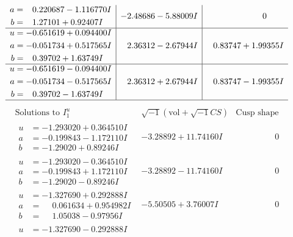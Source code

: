 \documentclass[1p]{elsarticle_modified}
\theoremstyle{definition}
\newcommand{\I}{\sqrt{-1}}
\begin{document}
$$\begin{array}{c|c|c}
\begin{aligned}
a &= \phantom{-}0.220687 - 1.116770 I \\
b &= \phantom{-}1.27101 + 0.92407 I\end{aligned}
 & -2.48686 - 5.88009 I & \phantom{-0.000000 } 0 \\ \hline\begin{aligned}
u &= -0.651619 + 0.094400 I \\
a &= -0.051734 + 0.517565 I \\
b &= \phantom{-}0.39702 + 1.63749 I\end{aligned}
 & \phantom{-}2.36312 - 2.67944 I & \phantom{-}0.83747 + 1.99355 I \\ \hline\begin{aligned}
u &= -0.651619 - 0.094400 I \\
a &= -0.051734 - 0.517565 I \\
b &= \phantom{-}0.39702 - 1.63749 I\end{aligned}
 & \phantom{-}2.36312 + 2.67944 I & \phantom{-}0.83747 - 1.99355 I\\
 \hline 
 \end{array}$$\newpage$$\begin{array}{c|c|c}  
\text{Solutions to }I^u_{1}& \I (\text{vol} + \sqrt{-1}CS) & \text{Cusp shape}\\
 \hline 
\begin{aligned}
u &= -1.293020 + 0.364510 I \\
a &= -0.199843 - 1.172110 I \\
b &= -1.29020 + 0.89246 I\end{aligned}
 & -3.28892 + 11.74160 I & \phantom{-0.000000 } 0 \\ \hline\begin{aligned}
u &= -1.293020 - 0.364510 I \\
a &= -0.199843 + 1.172110 I \\
b &= -1.29020 - 0.89246 I\end{aligned}
 & -3.28892 - 11.74160 I & \phantom{-0.000000 } 0 \\ \hline\begin{aligned}
u &= -1.327690 + 0.292888 I \\
a &= \phantom{-}0.061634 + 0.954982 I \\
b &= \phantom{-}1.05038 - 0.97956 I\end{aligned}
 & -5.50505 + 3.76007 I & \phantom{-0.000000 } 0 \\ \hline\begin{aligned}
u &= -1.327690 - 0.292888 I \\

\end{aligned}
\end{array}$$
\end{document}
